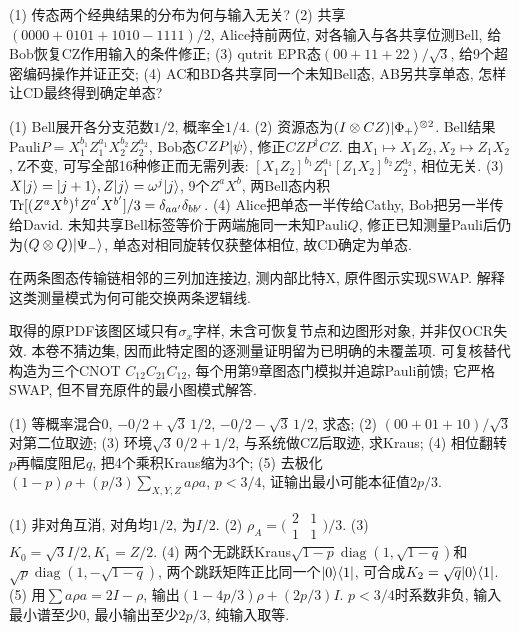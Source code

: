 \begin{exercise}(1) 传态两个经典结果的分布为何与输入无关? (2) 共享$(0000+0101+1010-1111)/2$, Alice持前两位, 对各输入与各共享位测Bell, 给Bob恢复CZ作用输入的条件修正; (3) qutrit EPR态$(00+11+22)/\sqrt3$, 给9个超密编码操作并证正交; (4) AC和BD各共享同一个未知Bell态, AB另共享单态, 怎样让CD最终得到确定单态?\end{exercise}
\begin{solution}(1) Bell展开各分支范数$1/2$, 概率全$1/4$. (2) 资源态为$(I\otimes CZ)\lvert \Phi_+\rangle^{\otimes2}$. Bell结果Pauli$P=X_1^{b_1}Z_1^{a_1}X_2^{b_2}Z_2^{a_2}$, Bob态$CZP\lvert \psi\rangle$, 修正$CZP^\dagger CZ$. 由$X_1\mapsto X_1Z_2,X_2\mapsto Z_1X_2$, Z不变, 可写全部16种修正而无需列表: $[X_1Z_2]^{b_1}Z_1^{a_1}[Z_1X_2]^{b_2}Z_2^{a_2}$, 相位无关. (3) $X\lvert j\rangle=\lvert j+1\rangle,Z\lvert j\rangle=\omega^j\lvert j\rangle$, 9个$Z^aX^b$, 两Bell态内积$\operatorname{Tr}[(Z^aX^b)^\dagger Z^{a'}X^{b'}]/3=\delta_{aa'}\delta_{bb'}$. (4) Alice把单态一半传给Cathy, Bob把另一半传给David. 未知共享Bell标签等价于两端施同一未知Pauli$Q$, 修正已知测量Pauli后仍为$(Q\otimes Q)\lvert \Psi_-\rangle$, 单态对相同旋转仅获整体相位, 故CD确定为单态.
\end{solution}
\begin{exercise}在两条图态传输链相邻的三列加连接边, 测内部比特X, 原件图示实现SWAP. 解释这类测量模式为何可能交换两条逻辑线.\end{exercise}
\begin{solution}取得的原PDF该图区域只有$\sigma_x$字样, 未含可恢复节点和边图形对象, 并非仅OCR失效. 本卷不猜边集, 因而此特定图的逐测量证明留为已明确的未覆盖项. 可复核替代构造为三个CNOT $C_{12}C_{21}C_{12}$, 每个用第9章图态门模拟并追踪Pauli前馈; 它严格SWAP, 但不冒充原件的最小图模式解答.
\end{solution}

\begin{exercise}(1) 等概率混合$0$, $-0/2+\sqrt3\,1/2$, $-0/2-\sqrt3\,1/2$, 求态; (2) $(00+01+10)/\sqrt3$对第二位取迹; (3) 环境$\sqrt3\,0/2+1/2$, 与系统做CZ后取迹, 求Kraus; (4) 相位翻转$p$再幅度阻尼$q$, 把4个乘积Kraus缩为3个; (5) 去极化$(1-p)\rho+(p/3)\sum_{X,Y,Z}a\rho a$, $p<3/4$, 证输出最小可能本征值$2p/3$.\end{exercise}
\begin{solution}(1) 非对角互消, 对角均$1/2$, 为$I/2$. (2) $\rho_A=\bigl(\begin{smallmatrix}2&1\\1&1\end{smallmatrix}\bigr)/3$. (3) $K_0=\sqrt3I/2,K_1=Z/2$. (4) 两个无跳跃Kraus$\sqrt{1-p}\operatorname{diag}(1,\sqrt{1-q})$和$\sqrt p\operatorname{diag}(1,-\sqrt{1-q})$, 两个跳跃矩阵正比同一个$\lvert 0\rangle\langle 1\rvert$, 可合成$K_2=\sqrt q\lvert 0\rangle\langle 1\rvert$. (5) 用$\sum a\rho a=2I-\rho$, 输出$(1-4p/3)\rho+(2p/3)I$. $p<3/4$时系数非负, 输入最小谱至少0, 最小输出至少$2p/3$, 纯输入取等.
\end{solution}
